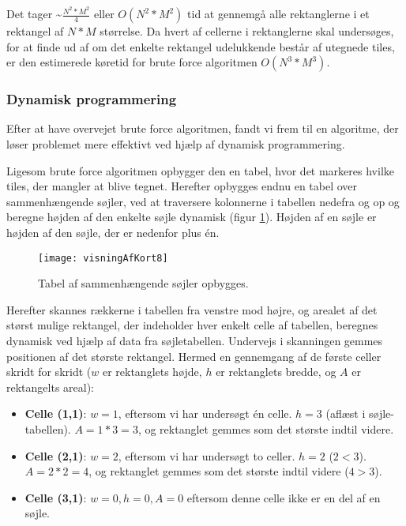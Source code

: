 Det tager \textasciitilde$\frac{N^2 * M^2}{4}$ eller $O(N^2 * M^2)$ tid at gennemgå alle rektanglerne i et rektangel af $N * M$ størrelse. Da hvert af cellerne i rektanglerne skal undersøges, for at finde ud af om det enkelte rektangel udelukkende består af utegnede tiles, er den estimerede køretid for brute force algoritmen $O(N^3 * M^3)$.

\subsubsection{Dynamisk programmering}
\label{subsec:dynamiskProgrammering}

Efter at have overvejet brute force algoritmen, fandt vi frem til en algoritme, der løser problemet mere effektivt ved hjælp af dynamisk programmering. 

Ligesom brute force algoritmen opbygger den en tabel, hvor det markeres hvilke tiles, der mangler at blive tegnet. Herefter opbygges endnu en tabel over sammenhængende søjler, ved at traversere kolonnerne i tabellen nedefra og op og beregne højden af den enkelte søjle dynamisk (figur \ref{figur:visningAfKort8}). Højden af en søjle er højden af den søjle, der er nedenfor plus én.

\begin{figure}[h]
	\centering
	\texttt{[image: visningAfKort8]}
	\captionsetup{width=0.8\textwidth}
	\caption{Tabel af sammenhængende søjler opbygges.}
	\label{figur:visningAfKort8}
\end{figure}

Herefter skannes rækkerne i tabellen fra venstre mod højre, og arealet af det størst mulige rektangel, der indeholder hver enkelt celle af tabellen, beregnes dynamisk ved hjælp af data fra søjletabellen. Undervejs i skanningen gemmes positionen af det største rektangel. Hermed en gennemgang af de første celler skridt for skridt ($w$ er rektanglets højde, $h$ er rektanglets bredde, og $A$ er rektangelts areal):

\begin{itemize}
	\item \textbf{Celle (1,1)}: $w = 1$, eftersom vi har undersøgt én celle. $h = 3$ (aflæst i søjle-tabellen). $A = 1 * 3 = 3$, og rektanglet gemmes som det største indtil videre.
	\item \textbf{Celle (2,1)}: $w = 2$, eftersom vi har undersøgt to celler. $h = 2$ ($2 < 3$). $A = 2 * 2 = 4$, og rektanglet gemmes som det største indtil videre ($4 > 3$).
	\item \textbf{Celle (3,1)}: $w = 0, h = 0, A = 0$ eftersom denne celle ikke er en del af en søjle.
\end{itemize}

